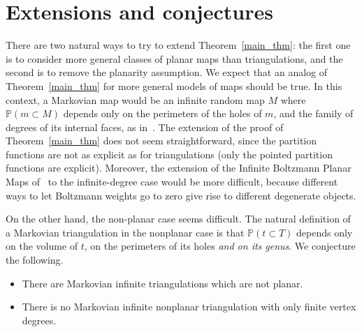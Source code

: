 \documentclass[AHL,Unicode,longabstracts,published]{cedram}
\renewcommand{\P}{\mathbb{P}}
\begin{document}
\section{Extensions and conjectures}\label{sec_conj}

There are two natural ways to try to extend Theorem~\ref{main_thm}: the first one is to consider more general classes of planar maps than triangulations, and the second is to remove the planarity assumption. We expect that an analog of Theorem~\ref{main_thm} for more general models of maps should be true. In this context, a Markovian map would be an infinite random map $M$ where $\P (m \subset M)$ depends only on the perimeters of the holes of $m$, and the family of degrees of its internal faces, as in~\cite[Theorem~4]{BL20}. The extension of the proof of Theorem~\ref{main_thm} does not seem straightforward, since the partition functions are not as explicit as for triangulations (only the pointed partition functions are explicit). Moreover, the extension of the Infinite Boltzmann Planar Maps of~\cite{BL20} to the infinite-degree case would be more difficult, because different ways to let Boltzmann weights go to zero give rise to different degenerate objects.

On the other hand, the non-planar case seems difficult. The natural definition of a Markovian triangulation in the nonplanar case is that $\P (t \subset T)$ depends only on the volume of $t$, on the perimeters of its holes \emph{and on its genus}. We conjecture the following.

\begin{conj}\leavevmode
\begin{itemize}
\item There are Markovian infinite triangulations which are not planar.
\item There is no Markovian infinite nonplanar triangulation with only finite vertex degrees.
\end{itemize}
\end{conj}
\end{document}
